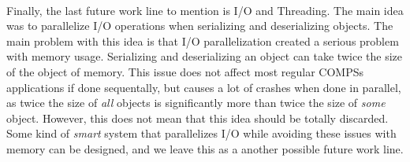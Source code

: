 \\
Finally, the last future work line to mention is I/O and Threading. The main idea was to parallelize I/O operations when serializing and deserializing objects. The main problem with this idea is that I/O parallelization created a serious problem with memory usage. Serializing and deserializing an object can take twice the size of the object of memory. This issue does not affect most regular COMPSs applications if done sequentally, but causes a lot of crashes when done in parallel, as twice the size of \textit{all} objects is significantly more than twice the size of \textit{some} object. However, this does not mean that this idea should be totally discarded. Some kind of \textit{smart} system that parallelizes I/O while avoiding these issues with memory can be designed, and we leave this as a another possible future work line.